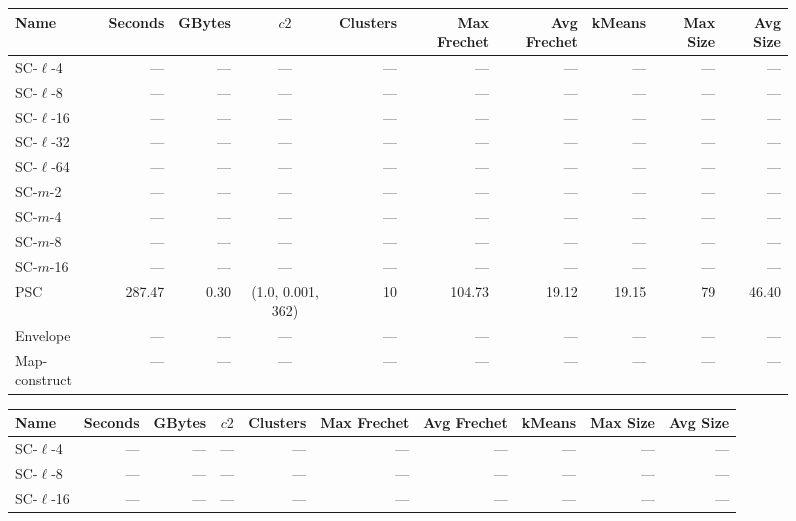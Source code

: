 \documentclass[11pt]{article}
\begin{document}
\clearpage
\newpage 
%
\clearpage
%
    \begin{figure} \begin{center}
        \begin{minipage}{\textwidth}
    {
    \begin{tabular}{@{}lrrcrrrrrr@{}}
        \toprule
        Name & Seconds & GBytes & $c2$ & Clusters & Max Frechet & Avg Frechet & kMeans & Max Size & Avg Size\\
        \midrule
        SC-$\ell$-4 & --- & --- & --- & --- & --- & --- & --- & --- & ---\\
SC-$\ell$-8 & --- & --- & --- & --- & --- & --- & --- & --- & ---\\
SC-$\ell$-16 & --- & --- & --- & --- & --- & --- & --- & --- & ---\\
SC-$\ell$-32& --- & --- & --- & --- & --- & --- & --- & --- & ---\\
SC-$\ell$-64 & --- & --- & --- & --- & --- & --- & --- & --- & ---\\
SC-$m$-2 & --- & --- & --- & --- & --- & --- & --- & --- & ---\\
SC-$m$-4 & --- & --- & --- & --- & --- & --- & --- & --- & ---\\
SC-$m$-8 & --- & --- & --- & --- & --- & --- & --- & --- & ---\\
SC-$m$-16 & --- & --- & --- & --- & --- & --- & --- & --- & ---\\
PSC & 287.47 & 0.30 & (1.0, 0.001, 362) & 10 & 104.73 & 19.12 & 19.15 & 79 & 46.40\\
Envelope & --- & --- & --- & --- & --- & --- & --- & --- & ---\\
Map-construct & --- & --- & --- & --- & --- & --- & --- & --- & ---\\
        \bottomrule
    \end{tabular}
    }
    {
    \begin{tabular}{@{}lrrcrrrrrr@{}}
        \toprule
        Name & Seconds & GBytes & $c2$ & Clusters & Max Frechet & Avg Frechet & kMeans & Max Size & Avg Size\\
        \midrule
        SC-$\ell$-4 & --- & --- & --- & --- & --- & --- & --- & --- & ---\\
SC-$\ell$-8 & --- & --- & --- & --- & --- & --- & --- & --- & ---\\
SC-$\ell$-16 & --- & --- & --- & --- & --- & --- & --- & --- & ---\\

\end{tabular}}
\end{minipage}
\end{center}
\end{figure}
\end{document}
